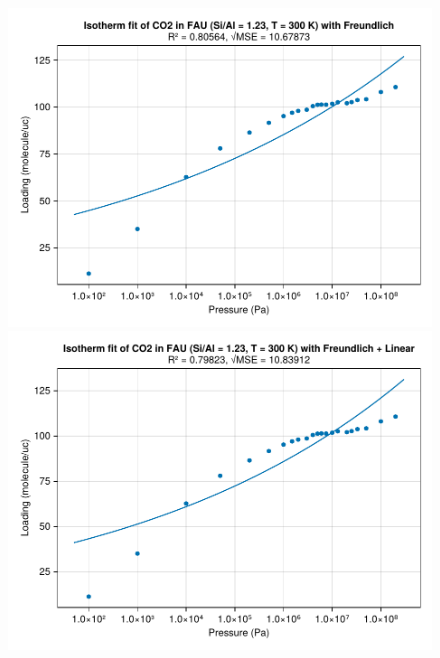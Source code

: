 \documentclass[main.tex]{subfiles}
\begin{document}
\begin{figure}
	\begin{minipage}{0.49\columnwidth}
		\includegraphics[width=\columnwidth]{figures/isotherms/Freundlich.pdf}
	\end{minipage}\hfill%
	\begin{minipage}{0.49\columnwidth}
		\includegraphics[width=\columnwidth]{figures/isotherms/Freundlich + Linear.pdf}
	\end{minipage}


\end{figure}
\end{document}
